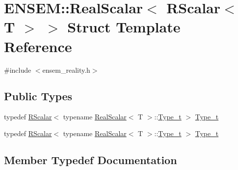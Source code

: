 \hypertarget{structENSEM_1_1RealScalar_3_01RScalar_3_01T_01_4_01_4}{}\section{E\+N\+S\+EM\+:\+:Real\+Scalar$<$ R\+Scalar$<$ T $>$ $>$ Struct Template Reference}
\label{structENSEM_1_1RealScalar_3_01RScalar_3_01T_01_4_01_4}


{\ttfamily \#include $<$ensem\+\_\+reality.\+h$>$}

\subsection*{Public Types}
\begin{DoxyCompactItemize}
\item 
typedef \mbox{\hyperlink{classENSEM_1_1RScalar}{R\+Scalar}}$<$ typename \mbox{\hyperlink{structENSEM_1_1RealScalar}{Real\+Scalar}}$<$ T $>$\+::\mbox{\hyperlink{structENSEM_1_1RealScalar_3_01RScalar_3_01T_01_4_01_4_a98fef60a69ef8b4856721a6f7b115ce5}{Type\+\_\+t}} $>$ \mbox{\hyperlink{structENSEM_1_1RealScalar_3_01RScalar_3_01T_01_4_01_4_a98fef60a69ef8b4856721a6f7b115ce5}{Type\+\_\+t}}
\item 
typedef \mbox{\hyperlink{classENSEM_1_1RScalar}{R\+Scalar}}$<$ typename \mbox{\hyperlink{structENSEM_1_1RealScalar}{Real\+Scalar}}$<$ T $>$\+::\mbox{\hyperlink{structENSEM_1_1RealScalar_3_01RScalar_3_01T_01_4_01_4_a98fef60a69ef8b4856721a6f7b115ce5}{Type\+\_\+t}} $>$ \mbox{\hyperlink{structENSEM_1_1RealScalar_3_01RScalar_3_01T_01_4_01_4_a98fef60a69ef8b4856721a6f7b115ce5}{Type\+\_\+t}}
\end{DoxyCompactItemize}


\subsection{Member Typedef Documentation}
\mbox{\label{structENSEM_1_1RealScalar_3_01RScalar_3_01T_01_4_01_4_a98fef60a69ef8b4856721a6f7b115ce5}} 
